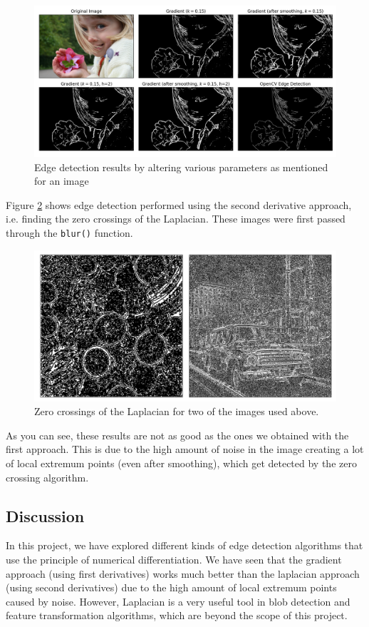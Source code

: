 \begin{figure}[H]
    \centering
    \includegraphics[width=0.8\linewidth]{Figures/1/kid.png}
    \caption{Edge detection results by altering various parameters as mentioned for an image}
    \label{edge3}
\end{figure}

Figure \ref{edge4} shows edge detection performed using the second derivative approach, i.e. finding the zero crossings of the Laplacian. These images were first passed through the \verb|blur()| function.

\begin{figure}[H]
    \centering
    \includegraphics[width=0.7\linewidth]{Figures/1/edge2.jpg}
    \caption{Zero crossings of the Laplacian for two of the images used above.}
    \label{edge4}
\end{figure}

As you can see, these results are not as good as the ones we obtained with the first approach. This is due to the high amount of noise in the image creating a lot of local extremum points (even after smoothing), which get detected by the zero crossing algorithm. 

\subsection{Discussion}

In this project, we have explored different kinds of edge detection algorithms that use the principle of numerical differentiation. We have seen that the gradient approach (using first derivatives) works much better than the laplacian approach (using second derivatives) due to the high amount of local extremum points caused by noise. However, Laplacian is a very useful tool in blob detection and feature transformation algorithms, which are beyond the scope of this project.

